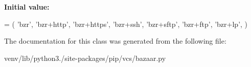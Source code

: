 {\bfseries Initial value\+:}
\begin{DoxyCode}
=  (
        \textcolor{stringliteral}{'bzr'}, \textcolor{stringliteral}{'bzr+http'}, \textcolor{stringliteral}{'bzr+https'}, \textcolor{stringliteral}{'bzr+ssh'}, \textcolor{stringliteral}{'bzr+sftp'}, \textcolor{stringliteral}{'bzr+ftp'},
        \textcolor{stringliteral}{'bzr+lp'},
    )
\end{DoxyCode}


The documentation for this class was generated from the following file\+:\begin{DoxyCompactItemize}
\item 
venv/lib/python3./site-\/packages/pip/vcs/bazaar.\+py\end{DoxyCompactItemize}
